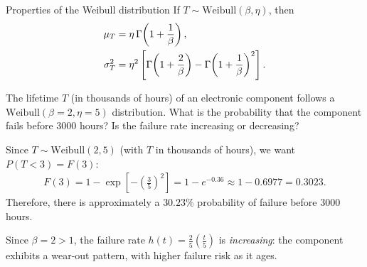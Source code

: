 {Properties of the Weibull distribution} If $T \sim \text{Weibull}(\beta,\eta)$, then
\begin{align}
 \mu_T &= \eta\,\Gamma\!\left(1 + \frac{1}{\beta}\right), \\
 \sigma_T^2 &= \eta^2\left[\Gamma\!\left(1 + \frac{2}{\beta}\right)
 - \Gamma\!\left(1 + \frac{1}{\beta}\right)^2\right].
\end{align}

\begin{ejemplo}
 \label{exmp:2.8.8}
The lifetime $T$ (in thousands of hours) of an electronic component follows a
$\text{Weibull}(\beta=2, \eta=5)$ distribution. What is the probability that the
component fails before $3000$ hours? Is the failure rate increasing or decreasing?
\end{ejemplo}

\begin{solucion}
Since $T \sim \text{Weibull}(2,5)$ (with $T$ in thousands of hours), we want $P(T < 3) =
F(3)$:
\begin{align}
 F(3) = 1 - \exp\!\left[-\left(\frac{3}{5}\right)^2\right]
 = 1 - e^{-0.36} \approx 1 - 0.6977 = 0.3023.
\end{align}
Therefore, there is approximately a $30.23\%$ probability of failure before $3000$
hours.

Since $\beta = 2 > 1$, the failure rate $h(t) = \frac{2}{5}\left(\frac{t}{5}\right)$ is
\emph{increasing}: the component exhibits a wear-out pattern, with higher failure risk
as it ages.
\end{solucion}

